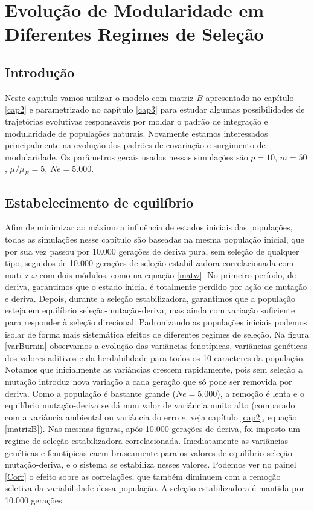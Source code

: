 \pagestyle{empty}
\cleardoublepage
\pagestyle{fancy}
\chapter{Evolução de Modularidade em Diferentes Regimes de
Seleção}\label{cap4}

\section{Introdução}

Neste capitulo vamos utilizar o modelo com matriz $B$ apresentado no
capítulo \ref{cap2} e parametrizado no capítulo \ref{cap3} para estudar
algumas possibilidades de trajetórias evolutivas responsáveis por moldar
o padrão de integração e modularidade de populações naturais. 
Novamente estamos interessados principalmente na evolução dos padrões de
covariação e surgimento de modularidade. 
Os parâmetros gerais usados nessas simulações são $p = 10$, $m = 50$,
$\mu/\mu_B = 5$, $Ne = 5.000$. 

\section{Estabelecimento de equilíbrio}

Afim de minimizar ao máximo a influência de estados iniciais das
populações, todas as simulações nesse capítulo são baseadas na mesma
população inicial, que por sua vez passou por 10.000 gerações de deriva
pura, sem seleção de qualquer tipo, seguidos de 10.000 gerações de
seleção estabilizadora correlacionada com matriz $\omega$ com dois
módulos, como na equação \ref{matw}. 
No primeiro período, de deriva, garantimos que o estado inicial é
totalmente perdido por ação de mutação e deriva. 
Depois, durante a seleção estabilizadora, garantimos que a população
esteja em equilíbrio seleção-mutação-deriva, mas ainda com variação
suficiente para responder à seleção direcional. 
Padronizando as populações iniciais podemos isolar de forma mais
sistemática efeitos de diferentes regimes de seleção. 
Na figura \ref{varBurnin} observamos a evolução das variâncias
fenotípicas, variâncias genéticas dos valores aditivos e da
herdabilidade para todos os 10 caracteres da população. 
Notamos que inicialmente as variâncias crescem rapidamente, pois sem
seleção a mutação introduz nova variação a cada geração que só pode ser
removida por deriva. 
Como a população é bastante grande ($Ne = 5.000$), a remoção é lenta e o
equilíbrio mutação-deriva se dá num valor de variância muito alto
(comparado com a variância ambiental ou variância do erro $e$, veja
capítulo \ref{cap2}, equação \ref{matrizB}). 
Nas mesmas figuras, após 10.000 gerações de deriva, foi imposto um regime de
seleção estabilizadora correlacionada. 
Imediatamente as variâncias genéticas e fenotípicas caem bruscamente
para os valores de equilíbrio seleção-mutação-deriva, e o sistema se
estabiliza nesses valores. 
Podemos ver no painel \ref{Corr} o efeito sobre as correlações,
que também diminuem com a remoção seletiva da variabilidade dessa
população. 
A seleção estabilizadora é mantida por 10.000 gerações. 


